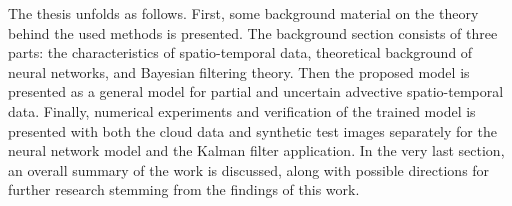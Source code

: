 The thesis unfolds as follows.
First, some background material on the theory behind the used methods is presented.
The background section consists of three parts: the characteristics of spatio-temporal data, theoretical background of neural networks, and Bayesian filtering theory. 
Then the proposed model is presented as a general model for partial and uncertain advective spatio-temporal data.
Finally, numerical experiments and verification of the trained model is presented with both the cloud data and synthetic test images separately for the neural network model and the Kalman filter application.
In the very last section, an overall summary of the work is discussed, along with possible directions for further research stemming from the findings of this work.
